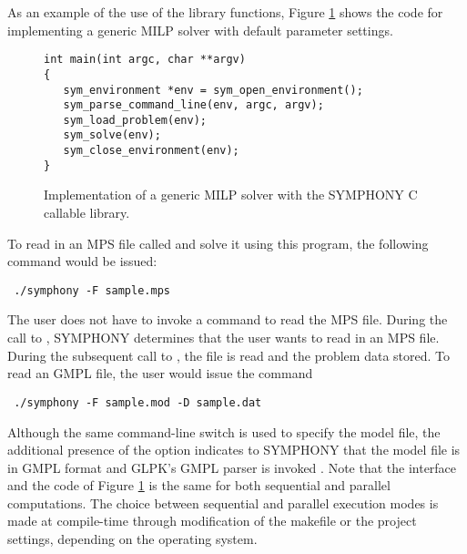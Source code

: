 \noindent As an example of the use of the library functions, Figure
\ref{default_main} shows the code for implementing a generic MILP solver with
default parameter settings.
\begin{figure}[tb]
{\color{Brown}
\begin{Verbatim}[frame=lines]
int main(int argc, char **argv)
{
   sym_environment *env = sym_open_environment();
   sym_parse_command_line(env, argc, argv);
   sym_load_problem(env);
   sym_solve(env);
   sym_close_environment(env);
}
\end{Verbatim}
}
\caption{Implementation of a generic MILP solver with the SYMPHONY
C callable library. \label{default_main}}
\end{figure}
To read in an MPS file called  and solve it using 
this program, the following command would be issued: \\
{\color{Brown}
\begin{verbatim}
 ./symphony -F sample.mps
\end{verbatim}
}
The user does not have to invoke a command to read the MPS file. During the
call to  , SYMPHONY determines that the
user wants to read in an MPS file. During the subsequent call to
, the file is read and the problem data stored.
To read an GMPL file, the user would issue the command
{\color{Brown}
\begin{verbatim}
 ./symphony -F sample.mod -D sample.dat
\end{verbatim}
}
Although the same command-line switch is used to specify the model file, the
additional presence of the  option indicates to SYMPHONY that the
model file is in GMPL format and GLPK's GMPL parser is invoked
\cite{GLPK}. Note that the interface and the code of Figure \ref{default_main}
is the same for both sequential and parallel computations. The choice between
sequential and parallel execution modes is made at compile-time through
modification of the makefile or the project settings, depending on the
operating system.

